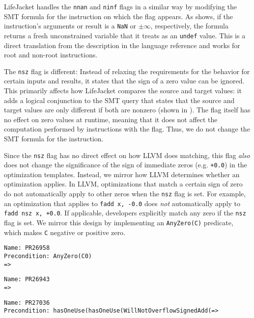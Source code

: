 \documentclass[preprint, numbers]{sigplanconf}
\newcommand{\xxx}{LifeJacket}
\begin{document}
\xxx{} handles the \texttt{nnan} and \texttt{ninf} flags in a similar way by
modifying the SMT formula for the instruction on which the flag appears. As
 shows, if the instruction's arguments or result is a
\texttt{NaN} or $\pm \infty$, respectively, the formula returns a fresh
unconstrained variable that it treats as an \texttt{undef} value. This is a
direct translation from the description in the language reference and works for
root and non-root instructions.

The \texttt{nsz} flag is different: Instead of relaxing the requirements for
the behavior for certain inputs and results, it states that the sign of a zero
value can be ignored. This primarily affects how \xxx{} compares the source and
target values: it adds a logical conjunction to the SMT query that states that
the source and target values are only different if both are nonzero (shown in
). The flag itself has no effect on zero values at runtime,
meaning that it does not affect the computation performed by instructions with
the flag. Thus, we do not change the SMT formula for the instruction.

Since the \texttt{nsz} flag has no direct effect on how LLVM does matching,
this flag \emph{also} does not change the significance of the sign of immediate
zeros (e.g. \texttt{+0.0}) in the optimization templates. Instead, we mirror
how LLVM determines whether an optimization applies. In LLVM, optimizations
that match a certain sign of zero do not automatically apply to other zeros
when the \texttt{nsz} flag is set. For example, an optimization that applies to
\texttt{fadd x, -0.0} does \emph{not} automatically apply to \texttt{fadd nsz
x, +0.0}. If applicable, developers explicitly match any zero if the
\texttt{nsz} flag is set.  We mirror this design by implementing an
\texttt{AnyZero(C)} predicate, which makes \texttt{C} negative or positive
zero.

\begin{figure*}
\centering
\small

\begin{minipage}[t]{5cm}
\begin{Verbatim}
Name: PR26958
Precondition: AnyZero(C0)
=>
\end{Verbatim}
\end{minipage} \begin{minipage}[t]{5cm}
\begin{Verbatim}
Name: PR26943
=>
\end{Verbatim}
\end{minipage} \begin{minipage}[t]{5cm}
\begin{Verbatim}
Name: PR27036
Precondition: hasOneUse(hasOneUse(WillNotOverflowSignedAdd(=>
\end{Verbatim}
\end{minipage}

\caption{New bugs in LLVM 3.7.1 found by \xxx{}.}
\label{fig:bugs}
\end{figure*}
\end{document}
